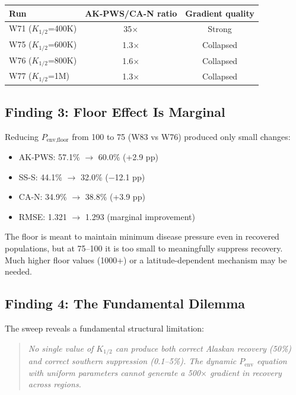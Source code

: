 \documentclass[11pt,a4paper]{article}
\begin{document}
\begin{center}
\begin{tabular}{lcc}
\toprule
Run & AK-PWS/CA-N ratio & Gradient quality \\
\midrule
W71 ($K_{1/2}$=400K) & 35$\times$ & Strong \\
W75 ($K_{1/2}$=600K) & 1.3$\times$ & Collapsed \\
W76 ($K_{1/2}$=800K) & 1.6$\times$ & Collapsed \\
W77 ($K_{1/2}$=1M) & 1.3$\times$ & Collapsed \\
\bottomrule
\end{tabular}
\end{center}

\subsection{Finding 3: Floor Effect Is Marginal}

Reducing $P_{\text{env,floor}}$ from 100 to 75 (W83 vs W76) produced only small changes:
\begin{itemize}[nosep]
    \item AK-PWS: 57.1\% $\to$ 60.0\% (+2.9 pp)
    \item SS-S: 44.1\% $\to$ 32.0\% ($-$12.1 pp)
    \item CA-N: 34.9\% $\to$ 38.8\% (+3.9 pp)
    \item RMSE: 1.321 $\to$ 1.293 (marginal improvement)
\end{itemize}

The floor is meant to maintain minimum disease pressure even in recovered populations, but at 75--100 it is too small to meaningfully suppress recovery. Much higher floor values (1000+) or a latitude-dependent mechanism may be needed.

\subsection{Finding 4: The Fundamental Dilemma}

The sweep reveals a fundamental structural limitation:

\begin{quote}
\textit{No single value of $K_{1/2}$ can produce both correct Alaskan recovery (50\%) and correct southern suppression (0.1--5\%). The dynamic $P_{\text{env}}$ equation with uniform parameters cannot generate a 500$\times$ gradient in recovery across regions.}
\end{quote}
\end{document}

